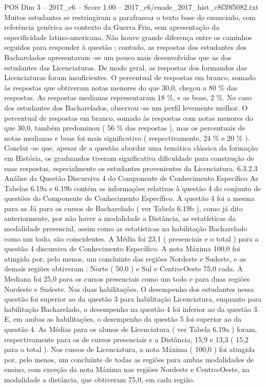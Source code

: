 \begin{textsample}{POS Dim 3 – 2017\_c6 – Score 1.00 – 2017\_c6/enade\_2017\_hist\_c8f39f5082.txt}
Muitos estudantes se restringiram a parafrasear o texto base do enunciado, com referência genérica ao contexto da Guerra Fria, sem apresentação da especificidade latino-americana.
Não houve grande diferença entre os caminhos seguidos para responder à questão ; contudo, as respostas dos estudantes dos Bacharelados apresentavam -se um pouco mais desenvolvidas que as dos estudantes das Licenciaturas.
De modo geral, as respostas dos formandos das Licenciaturas foram insuficientes.
O percentual de respostas em branco, somado às respostas que obtiveram notas menores do que 30,0, chegou a 80 \% das respostas.
As respostas medianas representaram 18 \%, e as boas, 2 \%.
No caso dos estudantes dos Bacharelados, observou -se um perfil levemente melhor.
O percentual de respostas em branco, somado às respostas com notas menores do que 30,0, também predominou ( 56 \% das respostas ), mas os percentuais de notas medianas e boas foi mais significativo ( respectivamente, 24 \% e 20 \% ).
Conclui -se que, apesar de a questão abordar uma temática clássica da formação em História, os graduandos tiveram significativa dificuldade para construção de suas respostas, especialmente os estudantes provenientes da Licenciatura. 6.3.2.3 Análise da Questão Discursiva 4 do Componente de Conhecimento Específico As Tabelas 6.19a e 6.19b contém as informações relativas à questão 4 do conjunto de questões do Componente de Conhecimento Específico.
A questão 4 foi a mesma para as Já para os cursos de Bacharelado ( ver Tabela 6.19b ), como já dito anteriormente, por não haver a modalidade a Distância, as estatísticas da modalidade presencial, assim como as estatísticas na habilitação Bacharelado como um todo, são coincidentes.
A Média foi 23,1 ( presenciais e o total ) para a questão 4 discursiva de Conhecimento Específico.
A nota Máxima 100,0 foi atingida por, pelo menos, um concluinte das regiões Nordeste e Sudeste, e as demais regiões obtiveram : Norte ( 50,0 ) e Sul e Centro-Oeste 75,0 cada.
A Mediana foi 25,0 para os cursos presenciais como um todo e para duas regiões Nordeste e Sudeste.
Nas duas habilitações.
O desempenho dos estudantes nessa questão foi superior ao da questão 3 para habilitação Licenciatura, enquanto para habilitação Bacharelado, o desempenho na questão 4 foi inferior ao da questão 3.
E, em ambas as habilitações, o desempenho da questão 5 foi superior ao da questão 4.
As Médias para os alunos de Licenciatura ( ver Tabela 6.19a ) foram, respectivamente para os de cursos presenciais e a Distância, 15,9 e 13,3 ( 15,2 para o total ).
Nos cursos de Licenciatura, a nota Máxima ( 100,0 ) foi atingida por, pelo menos, um concluinte de todas as regiões para ambas modalidades de ensino, com exceção da nota Máxima nas regiões Nordeste e Centro-Oeste, na modalidade a distância, que obtiveram 75,0, em cada região.

\end{textsample}
